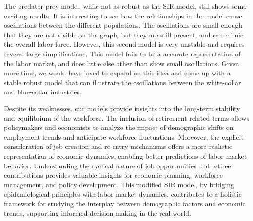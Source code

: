 \documentclass[11pt]{amsart}
\begin{document}
The predator-prey model, while not as robust as the SIR model, still shows some exciting results. 
It is interesting to see how the relationships in the model cause oscillations between the different populations. 
The oscillations are small enough that they are not visible on the graph, but they are still present, and can mimic the overall labor force.
However, this second model is very unstable and requires several large simplifications. This model fails to be a accurate representation of the labor market, 
and does little else other than show small oscillations. Given more time, we would have loved to expand on this idea and come up with a stable robust model that 
can illustrate the oscillations between the white-collar and blue-collar industries.

Despite its weaknesses, our models provide insights into the long-term stability and equilibrium of the workforce. 
The inclusion of retirement-related terms allows policymakers and economists to analyze the impact of demographic shifts on employment trends and anticipate 
workforce fluctuations. Moreover, the explicit consideration of job creation and re-entry mechanisms offers a more realistic representation of economic dynamics, 
enabling better predictions of labor market behavior. Understanding the cyclical nature of job opportunities and retiree contributions provides valuable insights 
for economic planning, workforce management, and policy development. This modified SIR model, by bridging epidemiological principles with labor market dynamics, 
contributes to a holistic framework for studying the interplay between demographic factors and economic trends, supporting informed decision-making in the real world.



\newpage 


\end{document}
